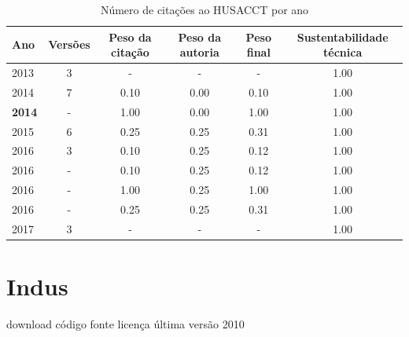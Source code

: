 \begin{table}[H]
\caption{Número de citações ao HUSACCT  por ano}
\centering
\begin{tabular}{| l | c | c | c | c | c |}
  \hline
  Ano & Versões & Peso da citação & Peso da autoria & Peso final & Sustentabilidade técnica \\
  \hline
        2013 & 3 & - & - & -
        &
          {\color{blue} 1.00}
        \\
\hline
            2014
          &
          7
          &
          0.10
          &
          0.00
          &
          0.10
          &
            {\color{blue} 1.00}
          \\
            {\bf 2014}
          &
          -
          &
          1.00
          &
          0.00
          &
          1.00
          &
            {\color{blue} 1.00}
          \\
\hline
            2015
          &
          6
          &
          0.25
          &
          0.25
          &
          0.31
          &
            {\color{blue} 1.00}
          \\
\hline
            2016
          &
          3
          &
          0.10
          &
          0.25
          &
          0.12
          &
            {\color{blue} 1.00}
          \\
            2016
          &
          -
          &
          0.10
          &
          0.25
          &
          0.12
          &
            {\color{blue} 1.00}
          \\
            2016
          &
          -
          &
          1.00
          &
          0.25
          &
          1.00
          &
            {\color{blue} 1.00}
          \\
            2016
          &
          -
          &
          0.25
          &
          0.25
          &
          0.31
          &
            {\color{blue} 1.00}
          \\
\hline
        2017 & 3 & - & - & -
        &
          {\color{blue} 1.00}
        \\
\hline
\end{tabular}
\end{table}



\section{Indus}
\checkmark download
\checkmark código fonte
\checkmark licença
\checkmark última versão 2010


